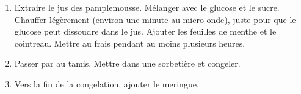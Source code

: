
\begin{ingredients}
\end{ingredients}


\begin{recipe}
  \begin{enumerate}

  \item Extraire le jus des pamplemousse.  Mélanger avec le glucose et
    le sucre.  Chauffer légèrement (environ une minute au micro-onde),
    juste pour que le glucose peut dissoudre dans le jus.  Ajouter les
    feuilles de menthe et le cointreau.  Mettre au frais pendant au
    moins plusieurs heures.

  \item Passer par au tamis.  Mettre dans une sorbetière et congeler.

  \item Vers la fin de la congelation, ajouter le meringue.

  \end{enumerate}
\end{recipe}

